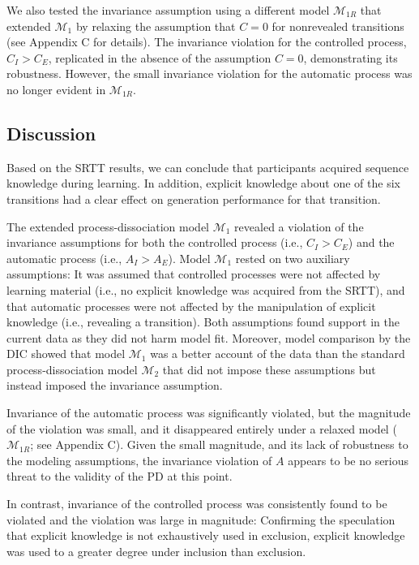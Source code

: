 \documentclass[floatsintext,doc]{apa6}
\theoremstyle{definition}
\theoremstyle{definition}
\theoremstyle{definition}
\theoremstyle{remark}
\begin{document}
We also tested the invariance assumption using a different model
\(\mathcal{M}_{1R}\) that extended \(\mathcal{M}_1\) by relaxing the
assumption that \(C = 0\) for nonrevealed transitions (see Appendix C
for details). The invariance violation for the controlled process,
\(C_I > C_E\), replicated in the absence of the assumption \(C=0\),
demonstrating its robustness. However, the small invariance violation
for the automatic process was no longer evident in \(\mathcal{M}_{1R}\).

\subsection{Discussion}\label{discussion-1}

Based on the SRTT results, we can conclude that participants acquired
sequence knowledge during learning. In addition, explicit knowledge
about one of the six transitions had a clear effect on generation
performance for that transition.

The extended process-dissociation model \(\mathcal{M}_1\) revealed a
violation of the invariance assumptions for both the controlled process
(i.e., \(C_I > C_E\)) and the automatic process (i.e., \(A_I > A_E\)).
Model \(\mathcal{M}_1\) rested on two auxiliary assumptions: It was
assumed that controlled processes were not affected by learning material
(i.e., no explicit knowledge was acquired from the SRTT), and that
automatic processes were not affected by the manipulation of explicit
knowledge (i.e., revealing a transition). Both assumptions found support
in the current data as they did not harm model fit. Moreover, model
comparison by the DIC showed that model \(\mathcal{M}_1\) was a better
account of the data than the standard process-dissociation model
\(\mathcal{M}_2\) that did not impose these assumptions but instead
imposed the invariance assumption.

Invariance of the automatic process was significantly violated, but the
magnitude of the violation was small, and it disappeared entirely under
a relaxed model (\(\mathcal{M}_{1R}\); see Appendix C). Given the small
magnitude, and its lack of robustness to the modeling assumptions, the
invariance violation of \(A\) appears to be no serious threat to the
validity of the PD at this point.

In contrast, invariance of the controlled process was consistently found
to be violated and the violation was large in magnitude: Confirming the
speculation that explicit knowledge is not exhaustively used in
exclusion, explicit knowledge was used to a greater degree under
inclusion than exclusion.
\end{document}
